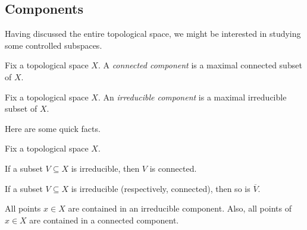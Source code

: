 \documentclass[../notes.tex]{subfiles}
\begin{document}
\subsection{Components}
Having discussed the entire topological space, we might be interested in studying some controlled subspaces.
\begin{definition}
	Fix a topological space $X$. A \textit{connected component} is a maximal connected subset of $X$.
\end{definition}
\begin{definition}
	Fix a topological space $X$. An \textit{irreducible component} is a maximal irreducible subset of $X$.
\end{definition}
Here are some quick facts.
\begin{lemma} \label{lem:componentsexist}
	Fix a topological space $X$.
	\begin{listalph}
		\item If a subset $V\subseteq X$ is irreducible, then $V$ is connected.
		\item If a subset $V\subseteq X$ is irreducible (respectively, connected), then so is $\overline V$.
		\item All points $x\in X$ are contained in an irreducible component. Also, all points of $x\in X$ are contained in a connected component.
	\end{listalph}
\end{lemma}
\end{document}
